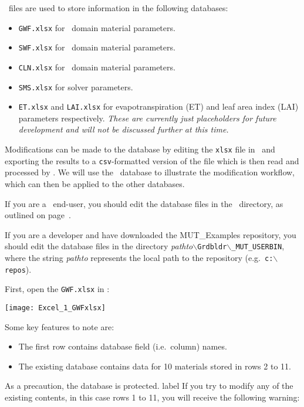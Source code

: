 \label{Appendix:ExcelUseage}
\excel\ files are used to store information in the following databases:
\begin{itemize}
  \item \texttt{GWF.xlsx} for \gwf\ domain material parameters.
  \item \texttt{SWF.xlsx} for \swf\ domain material parameters.
  \item \texttt{CLN.xlsx} for \cln\ domain material parameters.
  \item \texttt{SMS.xlsx} for solver parameters.
  \item \texttt{ET.xlsx} and  \texttt{LAI.xlsx} for evapotranspiration (ET) and leaf area index (LAI) parameters respectively.  {\em These are currently just placeholders for future development and will not be discussed further at this time.}
\end{itemize}

Modifications can be made to the database by editing the \texttt{xlsx} file in \excel\ and exporting the results to a \texttt{csv}-formatted version of the file which is then read and processed by \mut.  We will use the \gwf\ database to illustrate the modification workflow, which can then be applied to the other databases.

If you are a \mut\ end-user, you should edit the database files in the \bin\ directory, as outlined on page~\pageref{page:userbin}.

If you are a developer and have downloaded the MUT\_Examples repository, you should edit the database files in the directory \textit{pathto}\texttt{$\backslash$Grdbldr$\backslash$\_MUT\_USERBIN},
where the string \textit{pathto} represents the local path to the repository (e.g.\ \texttt{c:$\backslash$repos}).

First, open the \texttt{GWF.xlsx} in \excel:

    \texttt{[image: Excel\_1\_GWFxlsx]}

Some key features to note are:
\begin{itemize}
    \item The first row contains database field (i.e.\ column) names.
    \item The existing database contains data for 10 materials stored in rows 2 to 11.
\end{itemize}

As a precaution, the database is protected.  label If you try to modify any of the existing contents, in this case rows 1 to 11, you will receive the following warning:

